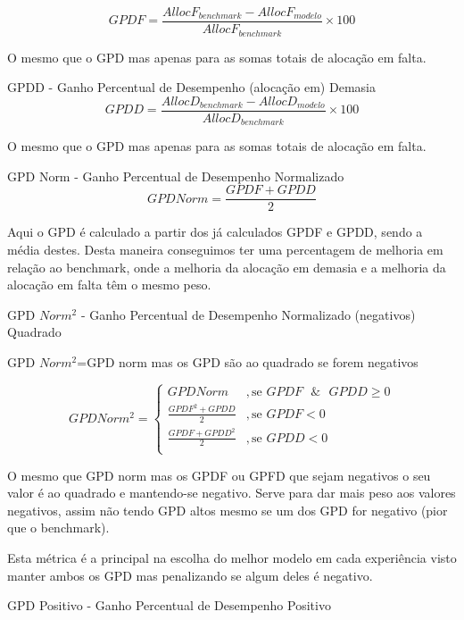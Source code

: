 \begin{equation} \label{eq:gpdf} 
    GPDF = \frac{AllocF_{benchmark} - AllocF_{modelo}}{AllocF_{benchmark}} \times 100
\end{equation}
\smallskip

O mesmo que o GPD mas apenas para as somas totais de alocação em falta.\par
\bigskip
GPDD - Ganho Percentual de Desempenho (alocação em) Demasia\\

\begin{equation} \label{eq:gpdd} 
    GPDD = \frac{AllocD_{benchmark} - AllocD_{modelo}}{AllocD_{benchmark}} \times 100
\end{equation}
\smallskip

O mesmo que o GPD mas apenas para as somas totais de alocação em falta.\par
\bigskip
GPD Norm - Ganho Percentual de Desempenho Normalizado \\

\begin{equation} \label{eq:gpdnorm} 
    GPD Norm = \frac{GPDF + GPDD}{2}
\end{equation}
\smallskip

Aqui o GPD é calculado a partir dos já calculados GPDF e GPDD, sendo a média destes. Desta maneira conseguimos ter uma percentagem de melhoria em relação ao benchmark, onde a melhoria da alocação em demasia e a melhoria da alocação em falta têm o mesmo peso.\par

\bigskip
GPD $Norm^{2}$ - Ganho Percentual de Desempenho Normalizado (negativos) Quadrado

 GPD $Norm^{2}$=GPD norm mas os GPD são ao quadrado se forem negativos  


 \begin{equation} \label{eq:gpdnorm2} 
    GPD Norm^{2} = 
    \begin{cases} 
        GPD Norm & , \text{se } GPDF \text{ }\&\text{ } GPDD \geq 0 \\
        \frac{GPDF^{2} + GPDD}{2} & , \text{se } GPDF  < 0 \\
        \frac{GPDF + GPDD^{2}}{2} & , \text{se } GPDD < 0 \\
    \end{cases} 
\end{equation}
\smallskip


O mesmo que GPD norm mas os GPDF ou GPFD que sejam negativos o seu valor é ao quadrado e mantendo-se negativo. Serve para dar mais peso aos valores negativos, assim não tendo GPD altos mesmo se um dos GPD for negativo (pior que o benchmark).\par
Esta métrica é a principal na escolha do melhor modelo em cada experiência visto manter ambos os GPD mas penalizando se algum deles é negativo.\par
\bigskip
GPD Positivo  - Ganho Percentual de Desempenho Positivo

